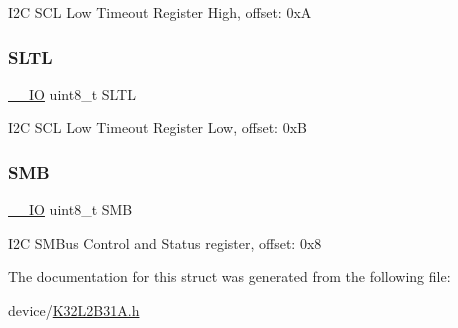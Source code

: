 I2C S\+CL Low Timeout Register High, offset\+: 0xA \mbox{\label{struct_i2_c___type_ae154cfc39aa9ad234093c3a7a469a27d}} 
\subsubsection{\texorpdfstring{SLTL}{SLTL}}
{\footnotesize\ttfamily \mbox{\hyperlink{core__cm0plus_8h_aec43007d9998a0a0e01faede4133d6be}{\+\_\+\+\_\+\+IO}} uint8\+\_\+t S\+L\+TL}

I2C S\+CL Low Timeout Register Low, offset\+: 0xB \mbox{\label{struct_i2_c___type_a7da5c460cfe30d313f3f057de44ae6b6}} 
\subsubsection{\texorpdfstring{SMB}{SMB}}
{\footnotesize\ttfamily \mbox{\hyperlink{core__cm0plus_8h_aec43007d9998a0a0e01faede4133d6be}{\+\_\+\+\_\+\+IO}} uint8\+\_\+t S\+MB}

I2C S\+M\+Bus Control and Status register, offset\+: 0x8 

The documentation for this struct was generated from the following file\+:\begin{DoxyCompactItemize}
\item 
device/\mbox{\hyperlink{_k32_l2_b31_a_8h}{K32\+L2\+B31\+A.\+h}}\end{DoxyCompactItemize}
